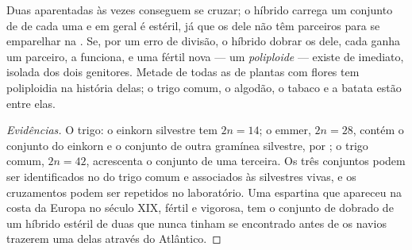 \begin{proposition}\label{prop:g12:diversification-of-life:polyploidy}
Duas  aparentadas às vezes conseguem se cruzar; o híbrido
carrega um conjunto de  de cada uma e em geral é estéril, já
que os  dele não têm parceiros para se emparelhar na .
Se, por um erro de divisão, o híbrido dobrar os  dele, cada
 ganha um parceiro, a  funciona, e uma  fértil
nova --- um \emph{poliploide} --- existe de
imediato, isolada dos dois genitores. Metade de todas as  de
plantas com flores tem poliploidia na história delas; o trigo comum, o
algodão, o tabaco e a batata estão entre elas.
\end{proposition}
\begin{proof}[Evidências]
O trigo: o einkorn silvestre tem $2n = 14$; o emmer, $2n = 28$, contém
o conjunto do einkorn e o conjunto de outra gramínea silvestre,
 por ; o trigo comum, $2n = 42$, acrescenta o
conjunto de uma terceira. Os três conjuntos podem ser identificados no
 do trigo comum e associados às  silvestres vivas, e
os cruzamentos podem ser repetidos no laboratório. Uma espartina que
apareceu na costa da Europa no século XIX, fértil e vigorosa, tem o
conjunto de  dobrado de um híbrido estéril de duas 
que nunca tinham se encontrado antes de os navios trazerem uma delas
através do Atlântico.
\end{proof}

